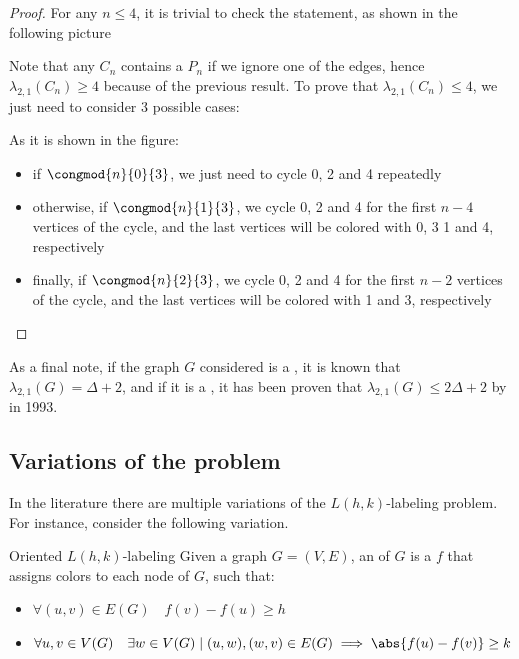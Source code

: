 \documentclass[a4paper, 12pt]{report}
\begin{document}
    \begin{proof}
        For any $n \le 4$, it is trivial to check the statement, as shown in the following picture


        Note that any $C_n$ contains a $P_n$ if we ignore one of the edges, hence $\lambda_{2,1}(C_n) \ge 4$ because of the previous result. To prove that $\lambda_{2,1}(C_n) \le 4$, we just need to consider 3 possible cases:


        As it is shown in the figure:

        \begin{itemize}
            \item if $\congmod{n}{0}{3}$, we just need to cycle 0, 2 and 4 repeatedly
            \item otherwise, if $\congmod{n}{1}{3}$, we cycle 0, 2 and 4 for the first $n - 4$ vertices of the cycle, and the last vertices will be colored with 0, 3 1 and 4, respectively
            \item finally, if $\congmod{n}{2}{3}$, we cycle 0, 2 and 4 for the first $n - 2$ vertices of the cycle, and the last vertices will be colored with 1 and 3, respectively
        \end{itemize}
    \end{proof}

    As a final note, if the graph $G$ considered is a \href{https://en.wikipedia.org/wiki/Lattice_graph}{}, it is known that $\lambda_{2,1}(G) = \Delta + 2$, and if it is a \href{https://en.wikipedia.org/wiki/Outerplanar_graph}{}, it has been proven that $\lambda_{2,1}(G) \le 2 \Delta + 2$ by \textcite{jonas} in 1993.

    \subsection{Variations of the problem}

    In the literature there are multiple variations of the $L(h, k)$-labeling problem. For instance, consider the following variation.

    \begin{frameddefn}{Oriented $L(h,k)$-labeling}
        Given a  graph $G= (V, E)$, an  of $G$ is a  $f$ that assigns colors to each node of $G$, such that:

        \begin{itemize}
            \item $\forall (u, v) \in E(G) \quad f(v) - f(u) \ge h$
            \item $\forall u, v \in V(G) \quad \exists w \in V(G) \mid (u, w), (w, v) \in E(G) \implies \abs{f(u) - f(v)} \ge k$
        \end{itemize}
    \end{frameddefn}
\end{document}
